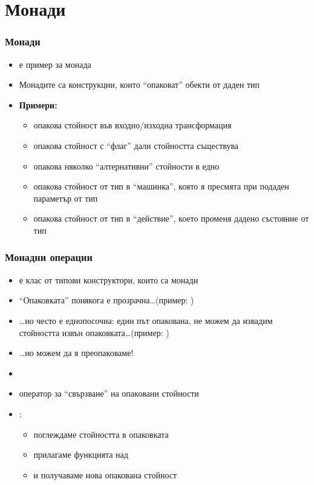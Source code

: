 \documentclass[alsotrans,beameroptions={aspectratio=169}]{beamerswitch}
\begin{document}
\section{Монади}

\begin{frame}
  \frametitle{Монади}

  \begin{itemize}[<+->]
  \item {} е пример за \alert{монада}
  \item Монадите са конструкции, които ``опаковат'' обекти от даден тип
  \item \textbf{Примери:}
    \begin{itemize}
    \item {} опакова стойност във входно/изходна трансформация
    \item {} опакова стойност с ``флаг'' дали стойността съществува
    \item \lst{[a]} опакова няколко ``алтернативни'' стойности в едно
    \item {} опакова стойност от тип  в ``машинка'', която я пресмята при подаден параметър от тип 
    \item {} опакова стойност от тип  в ``действие'', което променя дадено състояние от тип 
    \end{itemize}
  \end{itemize}
\end{frame}

\begin{frame}
  \frametitle{Монадни операции}

  \begin{itemize}[<+->]
  \item {} е клас от \alert{типови конструктори}, които
    са монади
  \item ``Опаковката'' понякога е прозрачна\ldots (пример: )
  \item \ldots но често е \alert{еднопосочна}: един път опакована, не можем да извадим стойността извън опаковката\ldots (пример: )
  \item \ldots но можем да я преопаковаме!
  \item {}
  \item оператор за ``свързване'' на опаковани стойности
  \item {}:
    \begin{itemize}
    \item поглеждаме стойността  в опаковката 
    \item прилагаме функцията  над 
    \item и получаваме нова опакована стойност 
    \end{itemize}
  \end{itemize}
\end{frame}
\end{document}
